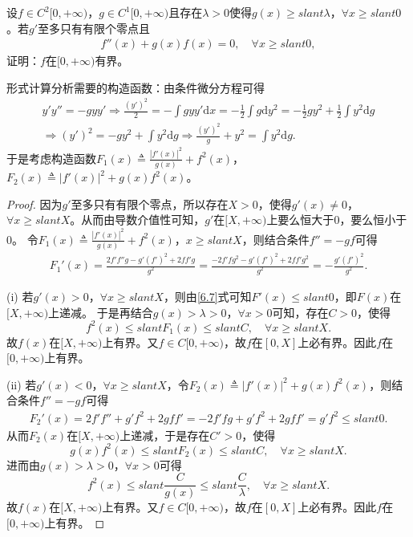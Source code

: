 \documentclass[../../main.tex]{subfiles}
\begin{document}
\begin{example}
设\(f \in C^{2}[0, +\infty)\)，\(g \in C^{1}[0, +\infty)\)且存在\(\lambda > 0\)使得\(g(x) \geqslant slant \lambda\)，\(\forall x \geqslant slant 0\)。若\(g'\)至多只有有限个零点且
\begin{align*}
f''(x)+g(x)f(x) = 0,\quad\forall x \geqslant slant 0,
\end{align*}
证明：\(f\)在\([0, +\infty)\)有界。
\end{example}
\begin{note}
形式计算分析需要的构造函数：由条件微分方程可得
\begin{align*}
y'y'' =-gyy' \Rightarrow \frac{( y' )^2}{2}=-\int{gyy'\mathrm{d}x}=-\frac{1}{2}\int{g\mathrm{d}y^2}=-\frac{1}{2}gy^2+\frac{1}{2}\int{y^2\mathrm{d}g}
\\
\Rightarrow ( y' )^2=-gy^2+\int{y^2\mathrm{d}g}\Rightarrow \frac{( y' )^2}{g}+y^2=\int{y^2\mathrm{d}g}.
\end{align*}
于是考虑构造函数\(F_1( x ) \triangleq \frac{| f'( x ) |^2}{g( x )}+f^2( x )\)，\(F_2( x ) \triangleq | f'( x ) |^2+g( x ) f^2( x )\)。
\end{note}
\begin{proof}
因为\(g'\)至多只有有限个零点，所以存在\(X>0\)，使得\(g'( x ) \ne 0\)，\(\forall x\geqslant slant X\)。从而由导数介值性可知，\(g'\)在\([ X,+\infty )\)上要么恒大于\(0\)，要么恒小于\(0\)。
令\(F_1( x ) \triangleq \frac{| f'( x ) |^2}{g( x )}+f^2( x )\)，\(x\geqslant slant X\)，则结合条件\(f'' =-gf\)可得
\begin{align}
F_{1}'( x ) =\frac{2f'f'' g-g'( f' )^2+2ff' g}{g^2}=\frac{-2f'fg^2-g'( f' )^2+2ff'g^2}{g^2}=-\frac{g'( f' )^2}{g^2}. \label{6.7}
\end{align}

(i) 若\(g'( x ) >0\)，\(\forall x\geqslant slant X\)，则由\eqref{6.7}式可知\(F'( x ) \leqslant slant 0\)，即\(F( x )\)在\([ X,+\infty )\)上递减。
于是再结合\(g( x ) >\lambda >0\)，\(\forall x>0\)可知，存在\(C>0\)，使得
\[
f^2( x ) \leqslant slant F_1( x ) \leqslant slant C,\quad\forall x\geqslant slant X.
\]
故\(f( x )\)在\([ X,+\infty )\)上有界。又\(f\in C[ 0,+\infty )\)，故\(f\)在\([ 0,X ]\)上必有界。因此\(f\)在\([ 0,+\infty )\)上有界。

(ii) 若\(g'( x ) <0\)，\(\forall x\geqslant slant X\)，令\(F_2( x ) \triangleq | f'( x ) |^2+g( x ) f^2( x )\)，则结合条件\(f'' =-gf\)可得
\begin{align}
F_{2}'( x ) =2f'f'' +g'f^2+2gff' =-2f'fg+g'f^2+2gff' =g'f^2\leqslant slant 0. \label{6.8}
\end{align}
从而\(F_2( x )\)在\([ X,+\infty )\)上递减，于是存在\(C'>0\)，使得
\[
g( x ) f^2( x ) \leqslant slant F_2( x ) \leqslant slant C,\quad\forall x\geqslant slant X.
\]
进而由\(g( x ) >\lambda >0\)，\(\forall x>0\)可得
\[
f^2( x ) \leqslant slant \frac{C}{g( x )}\leqslant slant \frac{C}{\lambda},\quad\forall x\geqslant slant X.
\]
故\(f( x )\)在\([ X,+\infty )\)上有界。又\(f\in C[ 0,+\infty )\)，故\(f\)在\([ 0,X ]\)上必有界。因此\(f\)在\([ 0,+\infty )\)上有界。
\end{proof}
\end{document}
